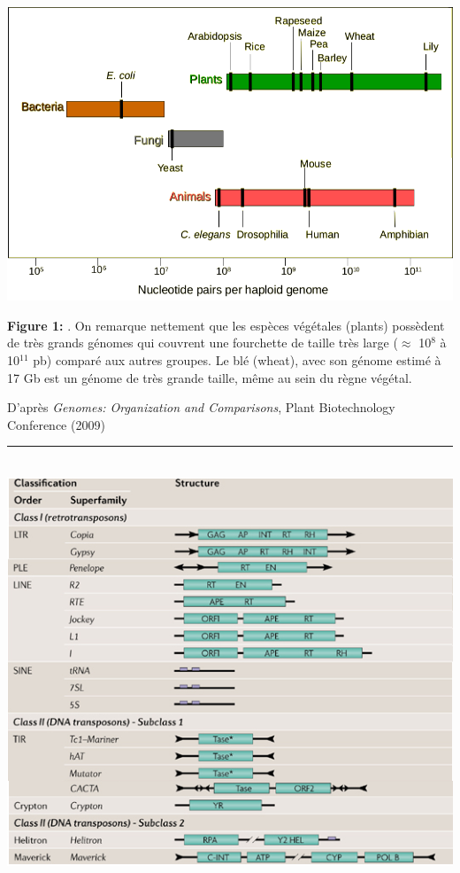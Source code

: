 \documentclass[a4paper, 12pt]{article}
\begin{document}
\begin{onehalfspace}
\newpage
\thispagestyle{empty}
\begin{center}
\vspace{1cm}
\includegraphics[scale=0.27]{pic_Data/fig1.png}\\
\vspace{0.2cm}
\end{center}
\textbf{Figure 1:} . On remarque nettement que les espèces végétales (plants) possèdent de très grands génomes qui couvrent une fourchette de taille très large ($\approx$ 10$^{8}$ à 10$^{11}$ pb) comparé aux autres groupes. Le blé (wheat), avec son génome estimé à 17 Gb est un génome de très grande taille, même au sein du règne végétal.\\ 
\begin{flushright} 
D'après \textit{Genomes: Organization and Comparisons}, Plant Biotechnology Conference (2009)\\
\end{flushright}
\begin{center}
\rule{10cm}{0.2pt}\\
\vspace{0.7cm}
\includegraphics[scale=0.4]{pic_Data/fig2.png}\\

\end{center}
\end{onehalfspace}
\end{document}
